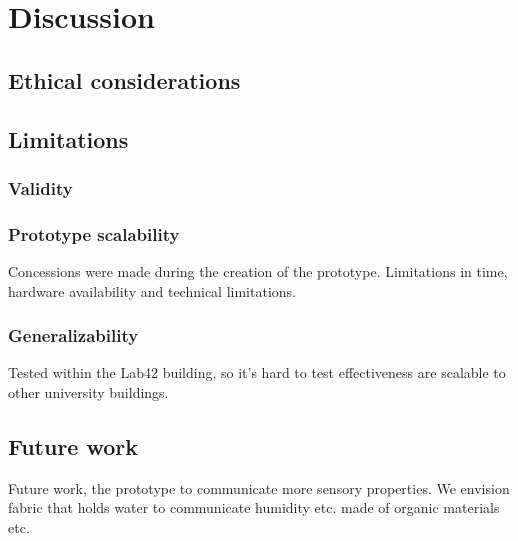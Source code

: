 \section{Discussion}
\label{sec:discussion}

\subsection{Ethical considerations}

\subsection{Limitations}

\subsubsection{Validity}

\subsubsection{Prototype scalability}
Concessions were made during the creation of the prototype. Limitations in time, hardware availability and technical limitations. 

\subsubsection{Generalizability}
Tested within the Lab42 building, so it's hard to test effectiveness are scalable to other university buildings.

\subsection{Future work}

Future work, the prototype to communicate more sensory properties. We envision fabric that holds water to communicate humidity etc. made of organic materials etc.